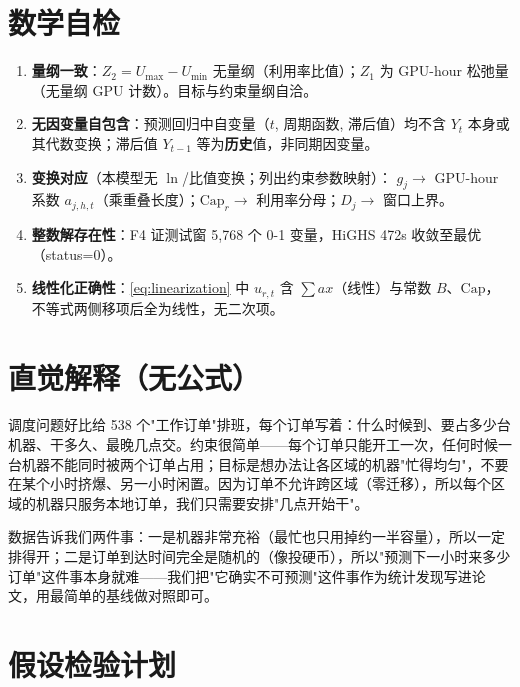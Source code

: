 \documentclass{internal-report}
\begin{document}
\section{数学自检}

\begin{enumerate}
  \item \textbf{量纲一致}：$Z_2 = U_{\max} - U_{\min}$ 无量纲（利用率比值）；$Z_1$ 为 GPU-hour 松弛量（无量纲 GPU 计数）。目标与约束量纲自洽。
  \item \textbf{无因变量自包含}：预测回归中自变量（$t$, 周期函数, 滞后值）均不含 $Y_t$ 本身或其代数变换；滞后值 $Y_{t-1}$ 等为\textbf{历史}值，非同期因变量。
  \item \textbf{变换对应}（本模型无 $\ln$/比值变换；列出约束参数映射）：
    $g_j \to$ GPU-hour 系数 $a_{j,h,t}$（乘重叠长度）；$\text{Cap}_r \to$ 利用率分母；$D_j \to$ 窗口上界。
  \item \textbf{整数解存在性}：F4 证测试窗 5,768 个 0-1 变量，HiGHS 472s 收敛至最优（status=0）。
  \item \textbf{线性化正确性}：\eqref{eq:linearization} 中 $u_{r,t}$ 含 $\sum a x$（线性）与常数 $B$、$\text{Cap}$，不等式两侧移项后全为线性，无二次项。
\end{enumerate}

\section{直觉解释（无公式）}

调度问题好比给 538 个"工作订单"排班，每个订单写着：什么时候到、要占多少台机器、干多久、最晚几点交。约束很简单——每个订单只能开工一次，任何时候一台机器不能同时被两个订单占用；目标是想办法让各区域的机器"忙得均匀"，不要在某个小时挤爆、另一小时闲置。因为订单不允许跨区域（零迁移），所以每个区域的机器只服务本地订单，我们只需要安排"几点开始干"。

数据告诉我们两件事：一是机器非常充裕（最忙也只用掉约一半容量），所以一定排得开；二是订单到达时间完全是随机的（像投硬币），所以"预测下一小时来多少订单"这件事本身就难——我们把"它确实不可预测"这件事作为统计发现写进论文，用最简单的基线做对照即可。

\section{假设检验计划}
\end{document}
